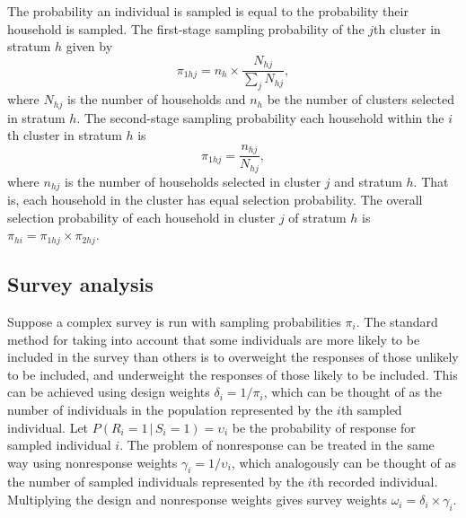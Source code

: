 \documentclass[a4paper, nobind]{templates/ociamthesis}
\begin{document}
The probability an individual is sampled is equal to the probability their household is sampled.
The first-stage sampling probability of the \(j\)th cluster in stratum \(h\) given by
\begin{equation}
\pi_{1hj} = n_h \times \frac{N_{hj}}{\sum_j N_{hj}},
\end{equation}
where \(N_{hj}\) is the number of households and \(n_h\) be the number of clusters selected in stratum \(h\).
The second-stage sampling probability each household within the \(i\)th cluster in stratum \(h\) is
\begin{equation}
\pi_{1hj} = \frac{n_{hj}}{N_{hj}},
\end{equation}
where \(n_{hj}\) is the number of households selected in cluster \(j\) and stratum \(h\).
That is, each household in the cluster has equal selection probability.
The overall selection probability of each household in cluster \(j\) of stratum \(h\) is \(\pi_{hi} = \pi_{1hj} \times \pi_{2hj}\).

\hypertarget{survey-analysis}{%
\subsection{Survey analysis}\label{survey-analysis}}

Suppose a complex survey is run with sampling probabilities \(\pi_i\).
The standard method for taking into account that some individuals are more likely to be included in the survey than others is to overweight the responses of those unlikely to be included, and underweight the responses of those likely to be included.
This can be achieved using design weights \(\delta_i = 1 / \pi_i\), which can be thought of as the number of individuals in the population represented by the \(i\)th sampled individual.
Let \(P(R_i = 1 \, | \, S_i = 1) = \upsilon_i\) be the probability of response for sampled individual \(i\).
The problem of nonresponse can be treated in the same way using nonresponse weights \(\gamma_i = 1 / \upsilon_i\), which analogously can be thought of as the number of sampled individuals represented by the \(i\)th recorded individual.
Multiplying the design and nonresponse weights gives survey weights \(\omega_i = \delta_i \times \gamma_i\).
\end{document}
